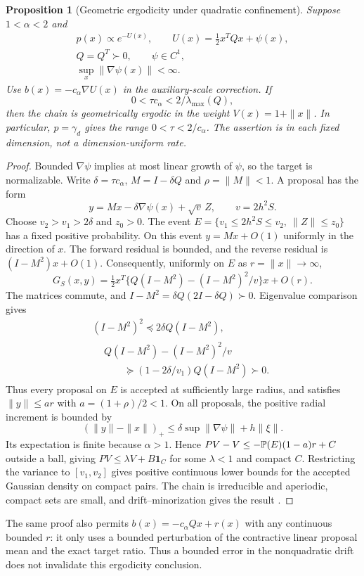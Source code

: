 \documentclass[pdflatex,iicol,sn-mathphys-ay]{sn-jnl}
\newtheorem{proposition}[theorem]{Proposition}
\theoremstyle{definition}\newtheorem{definition}[theorem]{Definition}
\theoremstyle{remark}\newtheorem{remark}[theorem]{Remark}
\numberwithin{equation}{section}
\newcommand{\1}{\mathbf 1}
\begin{document}
\begin{proposition}[Geometric ergodicity under quadratic confinement]\label{prop:auxgeom}
Suppose $1<\alpha<2$ and
\[
\begin{gathered}
p(x)\propto e^{-U(x)},\qquad U(x)=\tfrac12x^TQx+\psi(x),\\
Q=Q^T\succ0,\qquad \psi\in C^1,\\
\sup_x\|\nabla\psi(x)\|<\infty.
\end{gathered}
\]
Use $b(x)=-c_\alpha\nabla U(x)$ in the auxiliary-scale correction. If
\begin{equation}
 0<\tau c_\alpha<2/\lambda_{\max}(Q),
 \label{eq:quadraticconfinement}
\end{equation}
then the chain is geometrically ergodic in the weight $V(x)=1+\|x\|$. In particular, $p=\gamma_d$ gives the range $0<\tau<2/c_\alpha$. The assertion is in each fixed dimension, not a dimension-uniform rate.
\end{proposition}
\begin{proof}
Bounded $\nabla\psi$ implies at most linear growth of $\psi$, so the target is normalizable. Write $\delta=\tau c_\alpha$, $M=I-\delta Q$ and $\rho=\|M\|<1$. A proposal has the form
\[
 y=Mx-\delta\nabla\psi(x)+\sqrt v\,Z,\qquad v=2h^2S.
\]
Choose $v_2>v_1>2\delta$ and $z_0>0$. The event
$E=\{v_1\le2h^2S\le v_2,\ \|Z\|\le z_0\}$ has a fixed positive probability. On this event $y=Mx+O(1)$ uniformly in the direction of $x$. The forward residual is bounded, and the reverse residual is $(I-M^2)x+O(1)$. Consequently, uniformly on $E$ as $r=\|x\|\to\infty$,
\[
 G_S(x,y)=\tfrac12 x^T\{Q(I-M^2)-(I-M^2)^2/v\}x+O(r).
\]
The matrices commute, and $I-M^2=\delta Q(2I-\delta Q)\succ0$. Eigenvalue comparison gives
\[
\begin{gathered}
(I-M^2)^2\preceq 2\delta Q(I-M^2),\\
\begin{aligned}
&Q(I-M^2)-(I-M^2)^2/v\\
&\qquad\succeq(1-2\delta/v_1)Q(I-M^2)\succ0.
\end{aligned}
\end{gathered}
\]
Thus every proposal on $E$ is accepted at sufficiently large radius, and satisfies $\|y\|\le ar$ with $a=(1+\rho)/2<1$. On all proposals, the positive radial increment is bounded by
\[
 (\|y\|-\|x\|)_+\le\delta\sup\|\nabla\psi\|+h\|\xi\|.
\]
Its expectation is finite because $\alpha>1$. Hence $PV-V\le-\mathbb P(E)(1-a)r+C$ outside a ball, giving $PV\le\lambda V+B\1_C$ for some $\lambda<1$ and compact $C$. Restricting the variance to $[v_1,v_2]$ gives positive continuous lower bounds for the accepted Gaussian density on compact pairs. The chain is irreducible and aperiodic, compact sets are small, and drift--minorization gives the result \citep{roberts}.
\end{proof}
The same proof also permits $b(x)=-c_\alpha Qx+r(x)$ with any continuous bounded $r$: it only uses a bounded perturbation of the contractive linear proposal mean and the exact target ratio. Thus a bounded error in the nonquadratic drift does not invalidate this ergodicity conclusion.
\end{document}
